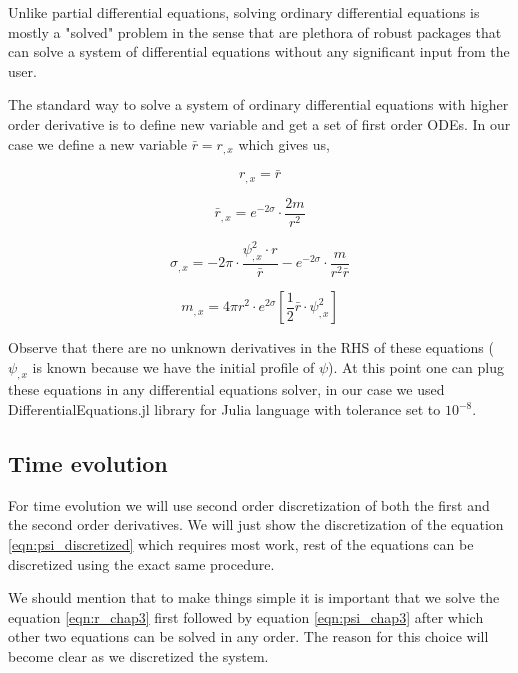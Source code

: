 Unlike partial differential equations, solving ordinary differential equations is mostly a "solved" problem in the sense that are plethora of robust packages that can solve a system of differential equations without any significant input from the user.

The standard way to solve a system of ordinary differential equations with higher order derivative is to define new variable and get a set of first order ODEs. In our case we define a new variable $\bar r = r_{,x}$ which gives us,


\begin{equation}
    r_{,x} = \bar r
    \label{eqn:r2_ic}
\end{equation}

\begin{equation}
    \bar r_{,x}=e^{-2 \sigma} \cdot \frac{2 m}{r^{2}}
    \label{eqn:br2_ic}
\end{equation}


\begin{equation}
    \sigma_{, x}= -2 \pi \cdot  \frac{\psi_{, x}^{2} \cdot r}{\bar r}- e^{-2 \sigma} \cdot \frac{ m}{r^{2}\bar r}
    \label{eqn:sigma2_ic}
\end{equation}

\begin{equation}
    m_{, x}=4 \pi r^{2} \cdot e^{2 \sigma}\left[\frac{1}{2} \bar r \cdot \psi_{, x}^{2} \right]
    \label{eqn:m2_ic}
\end{equation}

Observe that there are no unknown derivatives in the RHS of these equations ($\psi _{,x}$ is known because we have the initial profile of $\psi$). At this point one can plug these equations in any differential equations solver, in our case we used DifferentialEquations.jl library for Julia language with tolerance set to $10^{-8}$.



\subsection{Time evolution}

For time evolution we will use second order discretization of both the first and the second order derivatives. We will just show the discretization of the equation \ref{eqn:psi_discretized} which requires most work, rest of the equations can be discretized using the exact same procedure.

We should mention that to make things simple it is important that we solve the equation \ref{eqn:r_chap3} first followed by equation \ref{eqn:psi_chap3} after which other two equations can be solved in any order. The reason for this choice will become clear as we discretized the system.

